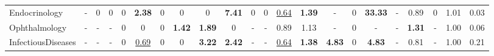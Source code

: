 \begin{landscape}
\begin{table}[H]
\begin{tabular}{l||ccccccccccc||cc||ccccc||cc||c}
Endocrinology          &               - &          \tiny{0} &          \tiny{0} &          \tiny{0} &     \textbf{2.38} &          \tiny{0} &          \tiny{0} &       \tiny{0} &     \textbf{7.41} &          \tiny{0} &          \tiny{0} &  \underline{0.64} &     \textbf{1.39} &                 - &          \tiny{0} &    \textbf{33.33} &                 - &              0.89 &          \tiny{0} &        1.01 &    0.03 \\
Ophthalmology          &               - &                 - &                 - &          \tiny{0} &          \tiny{0} &          \tiny{0} &     \textbf{1.42} &  \textbf{1.89} &          \tiny{0} &                 - &                 - &              0.89 &              1.13 &                 - &          \tiny{0} &                 - &                 - &     \textbf{1.31} &                 - &        1.00 &    0.06 \\
InfectiousDiseases     &               - &                 - &                 - &          \tiny{0} &  \underline{0.69} &          \tiny{0} &          \tiny{0} &  \textbf{3.22} &     \textbf{2.42} &                 - &                 - &  \underline{0.64} &     \textbf{1.38} &     \textbf{4.83} &          \tiny{0} &     \textbf{4.83} &                 - &              0.81 &                 - &        1.00 &    0.21 \\
\bottomrule
\end{tabular}
\end{table}


\end{landscape}
\restoregeometry